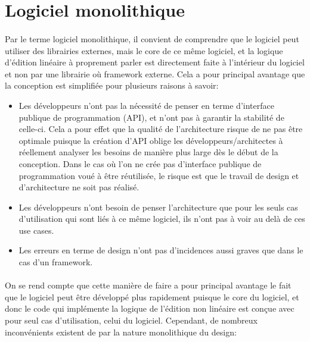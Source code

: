 \section{Logiciel monolithique} %

\paragraph{} Par le terme logiciel monolithique, il convient de
comprendre que le logiciel peut utiliser des librairies externes, mais
le core de ce même logiciel, et la logique d'édition linéaire à
proprement parler est directement faite à l'intérieur du logiciel et
non par une librairie où framework externe. Cela a pour principal avantage
que la conception est simplifiée pour plusieurs raisons à savoir:

\begin{itemize}
  \item {Les développeurs n'ont pas la nécessité de penser
    en terme d'interface publique de programmation (API),
    et n'ont pas à garantir la stabilité de celle-ci. Cela
    a pour effet que la qualité de l'architecture
    risque de ne pas être optimale puisque la création d'API oblige
    les développeurs/architectes à réellement analyser les besoins
    de manière plus large dès le début de la conception. Dans le cas
    où l'on ne crée pas d'interface publique de programmation voué à
    être réutilisée, le risque est que le travail de design et
    d'architecture ne soit pas réalisé.}
  \item {Les développeurs n'ont besoin de penser l'architecture que pour
    les seuls cas d'utilisation qui sont liés à ce même logiciel, %
    ils n'ont pas à voir au delà de ces use cases.}
  \item {Les erreurs en terme de design n'ont pas d'incidences aussi graves
    que dans le cas d'un framework.}
\end {itemize}

\paragraph{} On se rend compte que cette manière de faire a pour
principal avantage le fait que le logiciel peut être développé plus
rapidement puisque le core du logiciel, et donc le code qui implémente
la logique de l'édition non linéaire est conçue avec pour seul cas
d'utilisation, celui du logiciel. Cependant, de
nombreux inconvénients existent de par la nature monolithique du design:

